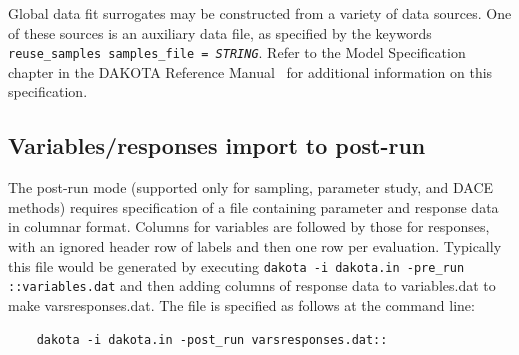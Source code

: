 Global data fit surrogates may be constructed from a variety of
data sources.  One of these sources is an auxiliary data file,
as specified by the keywords 
\texttt{reuse\_samples samples\_file = \emph{STRING}}.  Refer to the 
Model Specification chapter in the DAKOTA Reference 
Manual~\cite{RefMan} for additional information on this specification.

\subsection{Variables/responses import to post-run}

The post-run mode (supported only for sampling, parameter study, and
DACE methods) requires specification of a file containing parameter
and response data in columnar format.  Columns for variables are
followed by those for responses, with an ignored header row of labels
and then one row per evaluation.  Typically this file would be
generated by executing \texttt{dakota -i dakota.in -pre\_run
::variables.dat} and then adding columns of response data to
variables.dat to make varsresponses.dat.  The file is specified as
follows at the command line:
\begin{small}
\begin{verbatim}
    dakota -i dakota.in -post_run varsresponses.dat::
\end{verbatim}
\end{small}

